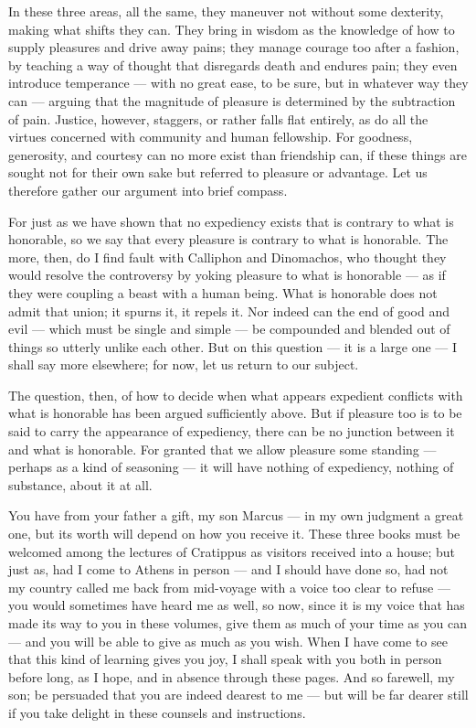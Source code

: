  In these three areas, all the same, they maneuver not without some dexterity, making what shifts they can. They bring in wisdom as the knowledge of how to supply pleasures and drive away pains; they manage courage too after a fashion, by teaching a way of thought that disregards death and endures pain; they even introduce temperance — with no great ease, to be sure, but in whatever way they can — arguing that the magnitude of pleasure is determined by the subtraction of pain. Justice, however, staggers, or rather falls flat entirely, as do all the virtues concerned with community and human fellowship. For goodness, generosity, and courtesy can no more exist than friendship can, if these things are sought not for their own sake but referred to pleasure or advantage. Let us therefore gather our argument into brief compass.

 For just as we have shown that no expediency exists that is contrary to what is honorable, so we say that every pleasure is contrary to what is honorable. The more, then, do I find fault with Calliphon and Dinomachos, who thought they would resolve the controversy by yoking pleasure to what is honorable — as if they were coupling a beast with a human being. What is honorable does not admit that union; it spurns it, it repels it. Nor indeed can the end of good and evil — which must be single and simple — be compounded and blended out of things so utterly unlike each other. But on this question — it is a large one — I shall say more elsewhere; for now, let us return to our subject.

 The question, then, of how to decide when what appears expedient conflicts with what is honorable has been argued sufficiently above. But if pleasure too is to be said to carry the appearance of expediency, there can be no junction between it and what is honorable. For granted that we allow pleasure some standing — perhaps as a kind of seasoning — it will have nothing of expediency, nothing of substance, about it at all.

 You have from your father a gift, my son Marcus — in my own judgment a great one, but its worth will depend on how you receive it. These three books must be welcomed among the lectures of Cratippus as visitors received into a house; but just as, had I come to Athens in person — and I should have done so, had not my country called me back from mid-voyage with a voice too clear to refuse — you would sometimes have heard me as well, so now, since it is my voice that has made its way to you in these volumes, give them as much of your time as you can — and you will be able to give as much as you wish. When I have come to see that this kind of learning gives you joy, I shall speak with you both in person before long, as I hope, and in absence through these pages. And so farewell, my son; be persuaded that you are indeed dearest to me — but will be far dearer still if you take delight in these counsels and instructions.

